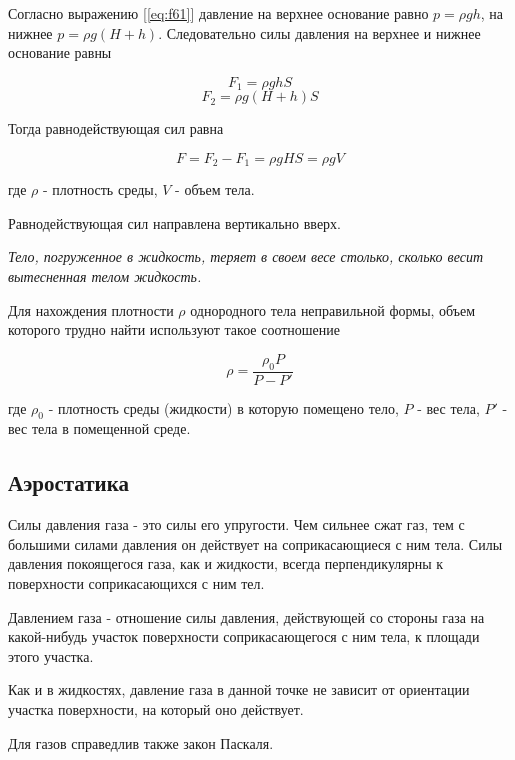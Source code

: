 \documentclass[a4paper,12pt]{article}
\begin{document}
		Согласно выражению [\ref{eq:f61}] давление на верхнее основание равно $p = \rho gh$,
		на нижнее $p = \rho g(H+h)$. Следовательно силы давления на верхнее и нижнее основание
		равны

		\begin{equation*}
			F_1 = \rho ghS
		\end{equation*}
		\begin{equation*}
			F_2 = \rho g(H+h)S
		\end{equation*}

		Тогда равнодействующая сил равна

		\begin{equation*}
			F = F_2-F_1 = \rho gHS = \rho gV
		\end{equation*}

		где $\rho$ - плотность среды, $V$ - объем тела.
		
		Равнодействующая сил направлена вертикально вверх.

		\textit{Тело, погруженное в жидкость, теряет в своем весе столько, сколько весит вытесненная
		телом жидкость.} 
		
		Для нахождения плотности $\rho$ однородного тела неправильной формы, объем которого 
		трудно найти используют такое соотношение
		
		\begin{equation}
			\rho = \frac{\rho_0 P}{P-P'}
		\end{equation}

		где $\rho_0$ - плотность среды (жидкости) в которую помещено тело, $P$ - вес тела,
		$P'$ - вес тела в помещенной среде.


		\subsection*{Аэростатика}

		Силы давления газа - это силы его упругости. Чем сильнее сжат газ, тем с большими 
		силами давления он действует на соприкасающиеся с ним тела. Силы давления покоящегося 
		газа, как и жидкости, всегда перпендикулярны к поверхности соприкасающихся с ним тел.

		Давлением газа - отношение силы давления, действующей со стороны газа на какой-нибудь
		участок поверхности соприкасающегося с ним тела, к площади этого участка. 
		
		Как и в жидкостях, давление газа в данной точке не зависит от ориентации участка 
		поверхности, на который оно действует. 
		
		Для газов справедлив также закон Паскаля.
\end{document}
